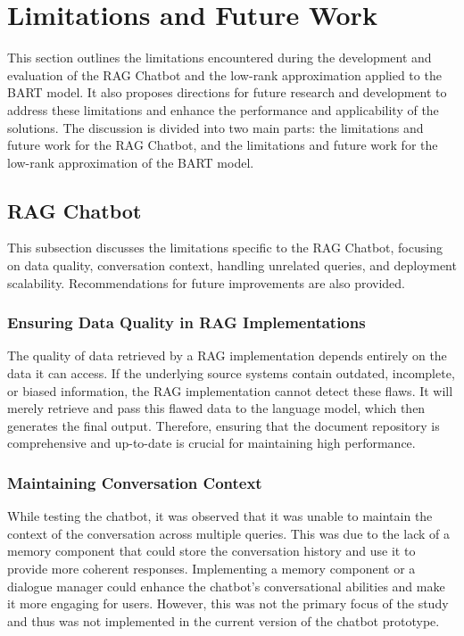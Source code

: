 \section{Limitations and Future Work} \label{limitations}
This section outlines the limitations encountered during the development and evaluation of the RAG Chatbot and the low-rank approximation applied to the BART model. It also proposes directions for future research and development to address these limitations and enhance the performance and applicability of the solutions. The discussion is divided into two main parts: the limitations and future work for the RAG Chatbot, and the limitations and future work for the low-rank approximation of the BART model.
\subsection{RAG Chatbot}
This subsection discusses the limitations specific to the RAG Chatbot, focusing on data quality, conversation context, handling unrelated queries, and deployment scalability. Recommendations for future improvements are also provided.
\subsubsection{Ensuring Data Quality in RAG Implementations}
The quality of data retrieved by a RAG implementation depends entirely on the data it can access. If the underlying source systems contain outdated, incomplete, or biased information, the RAG implementation cannot detect these flaws. It will merely retrieve and pass this flawed data to the language model, which then generates the final output. Therefore, ensuring that the document repository is comprehensive and up-to-date is crucial for maintaining high performance.

\subsubsection{Maintaining Conversation Context}
While testing the chatbot, it was observed that it was unable to maintain the context of the conversation across multiple queries. This was due to the lack of a memory component that could store the conversation history and use it to provide more coherent responses. Implementing a memory component or a dialogue manager could enhance the chatbot's conversational abilities and make it more engaging for users. However, this was not the primary focus of the study and thus was not implemented in the current version of the chatbot prototype.

